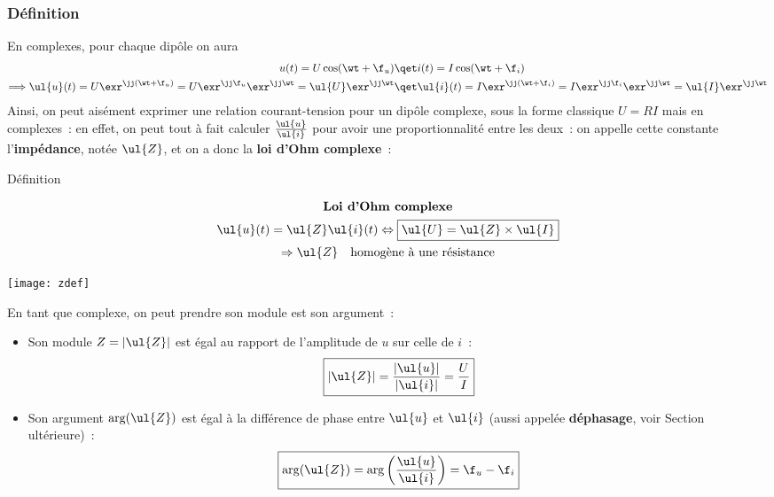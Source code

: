 \documentclass[../main/main.tex]{subfiles}
\begin{document}
\subsubsection{Définition}
En complexes, pour chaque dipôle on aura
\begin{align*}
    u(t) = U\cos(\wt+\f_u)
    &\qet
    i(t) = I\cos(\wt+\f_i)\\
    \Longrightarrow
    \ul{u}(t) = U\exr^{\jj(\wt+\f_u)} = U\exr^{\jj\f_u}\exr^{\jj\wt} =
    \ul{U}\exr^{\jj\wt}
    &\qet
    \ul{i}(t) = I\exr^{\jj(\wt+\f_i)} = I\exr^{\jj\f_i}\exr^{\jj\wt} =
    \ul{I}\exr^{\jj\wt}
\end{align*}
Ainsi, on peut aisément exprimer une relation courant-tension pour un dipôle
complexe, sous la forme classique $U = RI$ mais en complexes~: en effet, on peut
tout à fait calculer $\frac{\ul{u}}{\ul{i}}$ pour avoir une proportionnalité
entre les deux~: on appelle cette constante l'\textbf{impédance}, notée
$\ul{Z}$, et on a donc la \textbf{loi d'Ohm complexe}~:

\begin{rdefi}{Définition}
    \begin{minipage}{0.50\linewidth}
        \begin{gather*}
            \textbf{Loi d'Ohm complexe}\\
            \ul{u}(t) = \ul{Z}\ul{i}(t)
            \Leftrightarrow
            \boxed{\ul{U} = \ul{Z}\times\ul{I}}\\
            \Rightarrow
            \ul{Z}\quad\text{homogène à une résistance}
        \end{gather*}
    \end{minipage}
    \begin{minipage}{0.50\linewidth}
        \begin{center}
            \texttt{[image: zdef]}
        \end{center}
    \end{minipage}
\end{rdefi}

En tant que complexe, on peut prendre son module est son argument~:
\begin{itemize}
    \item Son module $Z = \left| \ul{Z} \right|$ est égal au rapport de
        l'amplitude de $u$ sur celle de $i$~:
        \[\boxed{ \left| \ul{Z} \right|
                = \frac{|\ul{u}|}{|\ul{i}|}
            = \frac{U}{I}
            }
        \]
    \item Son argument $\arg(\ul{Z})$ est égal à la différence de phase entre
        $\ul{u}$ et $\ul{i}$ (aussi appelée \textbf{déphasage}, voir Section
        ultérieure)~:
        \[\boxed{\arg(\ul{Z})
                = \arg \left( \frac{\ul{u}}{\ul{i}} \right)
            = \f_u - \f_i}
        \]
\end{itemize}
\end{document}
